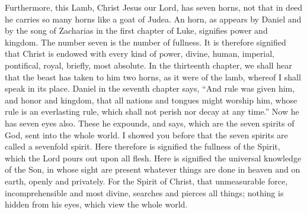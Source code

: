 Furthermore, this Lamb, Christ Jesus our Lord, has seven horns, not that in deed he carries so many horns like a goat of Judea. An horn, as appears by Daniel and by the song of Zacharias in the first chapter of Luke, signifies power and kingdom. The number seven is the number of fullness. It is therefore signified that Christ is endowed with every kind of power, divine, human, imperial, pontifical, royal, briefly, most absolute. In the thirteenth chapter, we shall hear that the beast has taken to him two horns, as it were of the lamb, whereof I shall speak in its place. Daniel in the seventh chapter says, “And rule was given him, and honor and kingdom, that all nations and tongues might worship him, whose rule is an everlasting rule, which shall not perish nor decay at any time.” Now he has seven eyes also. These he expounds, and says, which are the seven spirits of God, sent into the whole world. I showed you before that the seven spirits are called a sevenfold spirit. Here therefore is signified the fullness of the Spirit, which the Lord pours out upon all flesh. Here is signified the universal knowledge of the Son, in whose sight are present whatever things are done in heaven and on earth, openly and privately. For the Spirit of Christ, that unmeasurable force, incomprehensible and most divine, searches and pierces all things; nothing is hidden from his eyes, which view the whole world.

